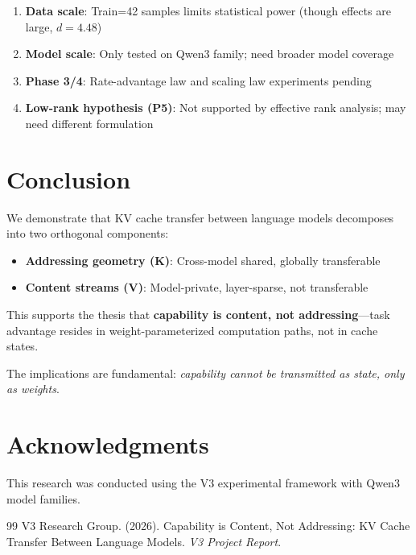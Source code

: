 \documentclass[11pt]{article}
\begin{document}
\begin{enumerate}
    \item \textbf{Data scale}: Train=42 samples limits statistical power (though effects are large, $d=4.48$)
    \item \textbf{Model scale}: Only tested on Qwen3 family; need broader model coverage
    \item \textbf{Phase 3/4}: Rate-advantage law and scaling law experiments pending
    \item \textbf{Low-rank hypothesis (P5)}: Not supported by effective rank analysis; may need different formulation
\end{enumerate}

\section{Conclusion}

We demonstrate that KV cache transfer between language models decomposes into two orthogonal components:
\begin{itemize}
    \item \textbf{Addressing geometry (K)}: Cross-model shared, globally transferable
    \item \textbf{Content streams (V)}: Model-private, layer-sparse, not transferable
\end{itemize}

This supports the thesis that \textbf{capability is content, not addressing}---task advantage resides in weight-parameterized computation paths, not in cache states.

The implications are fundamental: \emph{capability cannot be transmitted as state, only as weights}.

\section*{Acknowledgments}

This research was conducted using the V3 experimental framework with Qwen3 model families.


\begin{thebibliography}{99}
V3 Research Group. (2026).
\newblock Capability is Content, Not Addressing: KV Cache Transfer Between Language Models.
\newblock \emph{V3 Project Report}.
\end{thebibliography}
\end{document}
